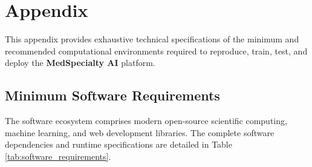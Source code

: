 \clearpage

\section{Appendix}

This appendix provides exhaustive technical specifications of the minimum and recommended computational environments required to reproduce, train, test, and deploy the \textbf{MedSpecialty AI} platform.

\enlargethispage{2\baselineskip}
\subsection{Minimum Software Requirements}

The software ecosystem comprises modern open-source scientific computing, machine learning, and web development libraries. The complete software dependencies and runtime specifications are detailed in Table \ref{tab:software_requirements}.

